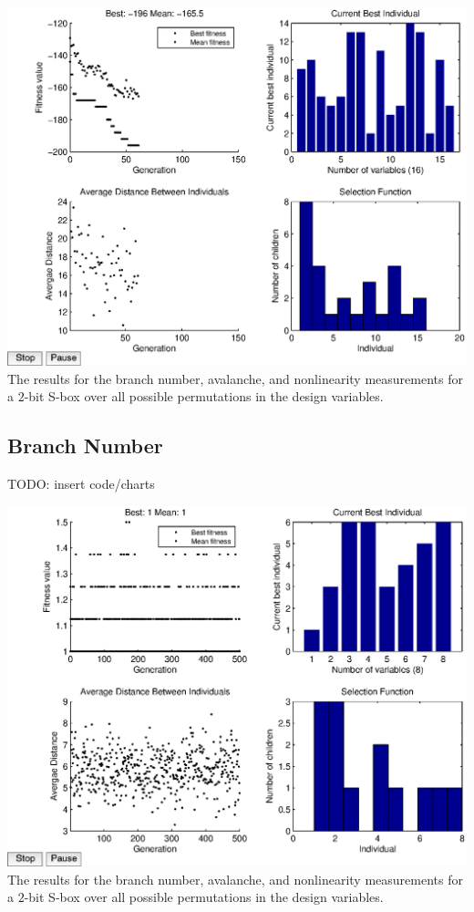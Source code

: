 \documentclass[11pt]{article}
\begin{document}
\begin{center}
	\includegraphics[scale=0.75]{images/avalanche_results16.eps} \\
	\label{bfjoint}
The results for the branch number, avalanche, and nonlinearity measurements for a $2$-bit S-box over all possible permutations in the design variables. 
\end{center}

\subsection{Branch Number}
TODO: insert code/charts

\begin{center}
	\includegraphics[scale=0.75]{images/bn_results8.eps} \\
	\label{bfjoint}
The results for the branch number, avalanche, and nonlinearity measurements for a $2$-bit S-box over all possible permutations in the design variables. 
\end{center}
\end{document}
